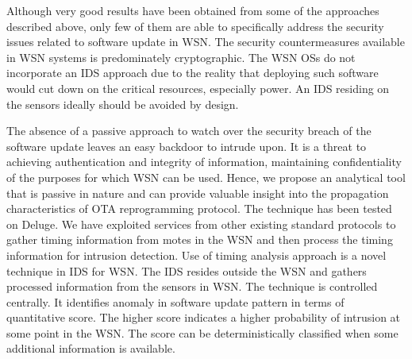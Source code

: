 \documentclass[conference,final]{IEEEtran}
\newcommand{\notedme}[1]{\raisebox{0pt}[0pt][0pt]{\pdfcomment[open=true,color=blue]{#1}}}
\begin{document}
Although very good results have been obtained from some of the approaches described above, only few of them are able to specifically address the security issues related to software update in WSN.
The security countermeasures available in WSN systems is predominately cryptographic.
The WSN OSs do not incorporate an IDS approach due to the reality that deploying such software would cut down on the critical resources, especially power.
An IDS residing on the sensors ideally should be avoided by design.

The absence of a passive approach to watch over the security breach of the software update leaves an easy backdoor  to intrude upon.
It is a threat to achieving authentication and integrity of information, maintaining confidentiality of the purposes for which WSN can be used.
Hence, we propose an analytical tool that is passive in nature and can provide valuable insight into the propagation characteristics of OTA reprogramming protocol. 
The technique has been tested on Deluge.
We have exploited services from other existing standard protocols to gather timing information from motes in  the WSN and then process the timing information for intrusion detection.
Use of timing analysis approach is a novel technique in IDS for WSN.
The IDS  resides outside the WSN and gathers processed information from the sensors in WSN.
The technique is controlled  centrally.
It  identifies anomaly in software update pattern in terms of quantitative score. 
The higher score indicates a higher probability of intrusion at some point in the WSN. 
The score can be deterministically classified when some additional information is available.
\end{document}
